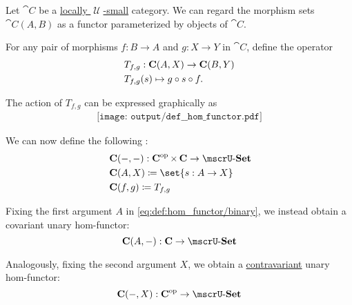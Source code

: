 \begin{definition}\label{def:hom_functor}
  Let \( \cat{C} \) be a \hyperref[def:category_size]{locally \( \mscrU \)-small} category. We can regard the morphism sets \( \cat{C}(A, B) \) as a functor parameterized by objects of \( \cat{C} \).

  \begin{thmenum}
     For any pair of morphisms \( f: B \to A \) and \( g: X \to Y \) in \( \cat{C} \), define the operator
    \begin{equation}\label{eq:def:hom_functor/t}
      \begin{aligned}
        &T_{f,g}: \cat{C}(A, X) \to \cat{C}(B, Y) \\
        &T_{f,g}(s) \mapsto g \bincirc s \bincirc f.
      \end{aligned}
    \end{equation}

    The action of \( T_{f,g} \) can be expressed graphically as
    \begin{equation}\label{eq:def:hom_functor/t_diagram}
      \begin{aligned}
        \texttt{[image: output/def\_\_hom\_functor.pdf]}
      \end{aligned}
    \end{equation}

    We can now define the following :
    \begin{equation}\label{eq:def:hom_functor/binary}
      \begin{aligned}
        &\cat{C}(\anon*, \anon*): \cat{C}^{\opcat} \times \cat{C} \to \ucat{Set} \\
        &\cat{C}(A, X) \coloneqq \set{ s: A \to X } \\
        &\cat{C}(f, g) \coloneqq T_{f,g}
      \end{aligned}
    \end{equation}

     Fixing the first argument \( A \) in \eqref{eq:def:hom_functor/binary}, we instead obtain a covariant unary hom-functor:
    \begin{equation}\label{eq:def:hom_functor/unary/covariant}
      \cat{C}(A, \anon*): \cat{C} \to \ucat{Set}
    \end{equation}

    Analogously, fixing the second argument \( X \), we obtain a \hyperref[def:hom_functor/contravariant]{contravariant} unary hom-functor:
    \begin{equation}\label{eq:def:hom_functor/unary/contravariant}
      \cat{C}(\anon*, X): \cat{C}^{\opcat} \to \ucat{Set}
    \end{equation}
  \end{thmenum}
\end{definition}
